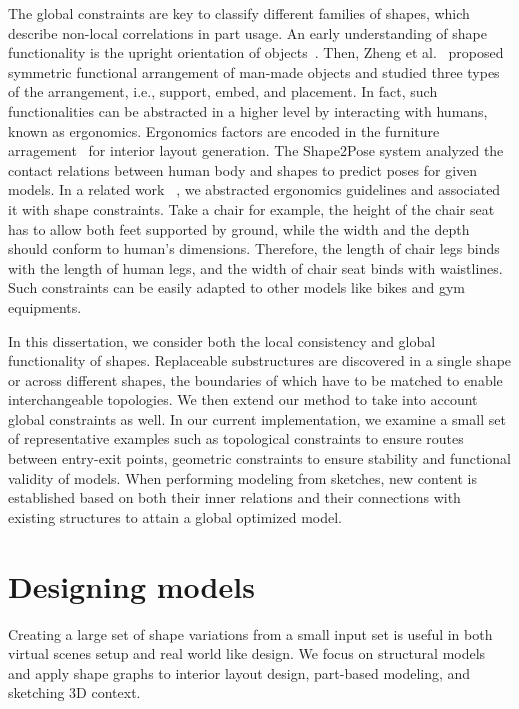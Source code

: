 The global constraints are key to classify different families of shapes, which describe non-local correlations in part usage. An early understanding of shape functionality is the upright orientation of objects~\cite{Fu2008}. Then, Zheng et al.~\cite{Zheng:2013} proposed symmetric functional arrangement of man-made objects and studied three types of the arrangement, i.e., support, embed, and placement. In fact, such functionalities can be abstracted in a higher level by interacting with humans, known as ergonomics. Ergonomics factors are encoded in the furniture arragement~\cite{yu2011make} for interior layout generation. The Shape2Pose system\cite{Kim:2014:SHS} analyzed the contact relations between human body and shapes to predict poses for given models. In a related work ~\cite{zldm_ergonomics_tvcg15}, we abstracted ergonomics guidelines and associated it with shape constraints. Take a chair for example, the height of the chair seat has to allow both feet supported by ground, while the width and the depth should conform to human's dimensions. Therefore, the length of chair legs binds with the length of human legs, and the width of chair seat binds with waistlines. Such constraints can be easily adapted to other models like bikes and gym equipments.

In this dissertation, we consider both the local consistency and global functionality of shapes. Replaceable substructures are discovered in a single shape or across different shapes, the boundaries of which have to be matched to enable interchangeable topologies. We then extend our method to take into account global constraints as well. In our current implementation, we examine a small set of representative examples such as topological constraints to ensure routes between entry-exit points, geometric constraints to ensure stability and functional validity of models. When performing modeling from sketches, new content is established based on both their inner relations and their connections with existing structures to attain a global optimized model.

\section{Designing models}

Creating a large set of shape variations from a small input set is useful in both virtual scenes setup and real world like design. We focus on structural models and apply shape graphs to interior layout design, part-based modeling, and sketching 3D context.


